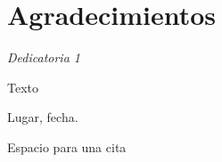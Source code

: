 \chapter*{Agradecimientos}

\begin{flushright}
    \emph{Dedicatoria 1}
\end{flushright}

Texto

\begin{flushright}
Lugar, fecha.
\end{flushright}

\begin{parrafoDestacado}
\begin{flushright}
Espacio para una cita
\end{flushright}
\end{parrafoDestacado} 